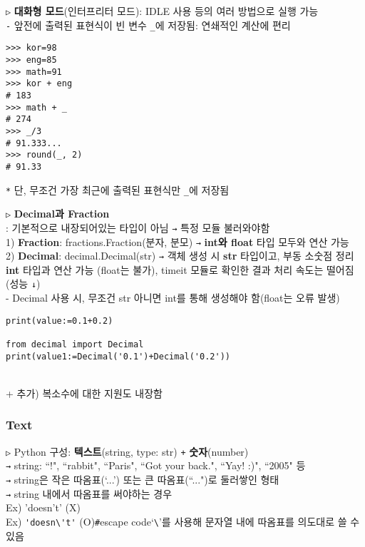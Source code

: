 \documentclass[11pt,a4paper]{article}
\begin{document}
\texttt{▷} \textbf{대화형 모드}(인터프리터 모드): IDLE 사용 등의 여러 방법으로 실행 가능\\
\texttt{-} 앞전에 출력된 표현식이 빈 변수 \texttt{\_}에 저장됨: 연쇄적인 계산에 편리\\
\begin{lstlisting}[label={list:first},caption=대화형 모드 -- 변수`\texttt{\_}' 설명]
>>> kor=98
>>> eng=85
>>> math=91
>>> kor + eng
# 183
>>> math + _
# 274
>>> _/3
# 91.333...
>>> round(_, 2)
# 91.33
\end{lstlisting}
\texttt{*} 단, 무조건 가장 최근에 출력된 표현식만 \texttt{\_}에 저장됨

\begin{spacing}{1.5}
\texttt{▷} \textbf{Decimal과 Fraction}\\
\hspace*{2em}: 기본적으로 내장되어있는 타입이 아님 \texttt{→} 특정 모듈 불러와야함\\
1) \textbf{Fraction}: fractions.Fraction(분자, 분모) \texttt{→} \textbf{int와 float} 타입 모두와 연산 가능\\
2) \textbf{Decimal}: decimal.Decimal(str) \texttt{→} 객체 생성 시 \textbf{str} 타입이고, 부동 소숫점 정리\\
\hspace*{2em}\textbf{int} 타입과 연산 가능 (float는 불가), timeit 모듈로 확인한 결과 처리 속도는 떨어짐(성능 \texttt{↓})\\
- Decimal 사용 시, 무조건 str 아니면 int를 통해 생성해야 함(float는 오류 발생)
\begin{lstlisting}[label={list:first}]
print(value:=0.1+0.2)

from decimal import Decimal
print(value1:=Decimal('0.1')+Decimal('0.2'))
\end{lstlisting}\\
+ 추가)  복소수에 대한 지원도 내장함
\end{spacing}

\subsubsection{\Large\textbf{Text}}
\begin{spacing}{1.5}
\texttt{▷} Python 구성: \textbf{텍스트}(string, type: str) \texttt{+} \textbf{숫자}(number)\\
\hspace*{2em}\texttt{→} string: ``!", ``rabbit", ``Paris", ``Got your back.", ``Yay! :)", ``2005" 등\\
\hspace*{2em}\texttt{→} string은 작은 따옴표(`...') 또는 큰 따옴표(``...")로 둘러쌓인 형태\\
\hspace*{2em}\texttt{→} string 내에서 따옴표를 써야하는 경우\\
\hspace*{4em}Ex) 'doesn't' (X)\\
\hspace*{4em}Ex) \verb|'doesn\'t'| (O)\qquad\verb|#|escape code`\verb|\|'를 사용해 문자열 내에 따옴표를 의도대로 쓸 수 있음
\end{spacing}
\end{document}
